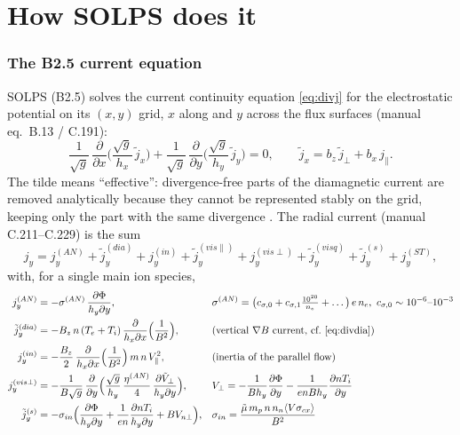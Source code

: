 \documentclass[11pt,a4paper]{article}
\newcommand{\Te}{T_e}
\newcommand{\Ti}{T_i}
\newcommand{\jpar}{j_\parallel}
\begin{document}
\part{How SOLPS does it}

\section{The B2.5 current equation}

SOLPS (B2.5) solves the current continuity equation \eqref{eq:divj} for the electrostatic potential on its
$(x,y)$ grid, $x$ along and $y$ across the flux surfaces (manual eq.~B.13 / C.191):
\begin{equation}
  \frac{1}{\sqrt g}\,\frac{\partial}{\partial x}\Big(\frac{\sqrt g}{h_x}\,\tilde j_x\Big)
  + \frac{1}{\sqrt g}\,\frac{\partial}{\partial y}\Big(\frac{\sqrt g}{h_y}\,\tilde j_y\Big) = 0,
  \qquad \tilde j_x = b_z\,\tilde j_\perp + b_x\,\jpar .
  \label{eq:solpscc}
\end{equation}
The tilde means ``effective'': divergence-free parts of the diamagnetic current are removed analytically because they
cannot be represented stably on the grid, keeping only the part with the same divergence \cite{rozhansky2001}. The
radial current (manual C.211--C.229) is the sum
\begin{equation}
  j_y = j^{(AN)}_y + \tilde j^{(dia)}_y + j^{(in)}_y + \tilde j^{(vis\parallel)}_y + j^{(vis\perp)}_y
      + \tilde j^{(visq)}_y + \tilde j^{(s)}_y + j^{(ST)}_y ,
  \label{eq:solpsjy}
\end{equation}
with, for a single main ion species,
\begin{align}
  j^{(AN)}_y &= -\sigma^{(AN)}\,\frac{\partial\Phi}{h_y\partial y},
  && \sigma^{(AN)} = \big(c_{\sigma,0} + c_{\sigma,1}\tfrac{10^{20}}{n_e} + \dots\big)\,e\,n_e,\ c_{\sigma,0}\sim10^{-6}\text{--}10^{-3}
  \label{eq:solpsan}\\
  \tilde j^{(dia)}_y &= -B_z\,n\,(\Te+\Ti)\,\frac{\partial}{h_x\partial x}\Big(\frac{1}{B^2}\Big),
  && \text{(vertical $\nabla B$ current, cf.\ \eqref{eq:divdia})}
  \label{eq:solpsdia}\\
  j^{(in)}_y &= -\frac{B_z}{2}\,\frac{\partial}{h_x\partial x}\Big(\frac{1}{B^2}\Big)\,m\,n\,V_\parallel^2,
  && \text{(inertia of the parallel flow)}
  \label{eq:solpsin}\\
  j^{(vis\perp)}_y &= -\frac{1}{B\sqrt g}\,\frac{\partial}{\partial y}\Big(\frac{\sqrt g}{h_y}\,\frac{\eta^{(AN)}}{4}\,\frac{\partial \tilde V_\perp}{h_y\partial y}\Big),
  && V_\perp = -\frac{1}{B h_y}\frac{\partial\Phi}{\partial y} - \frac{1}{e n B h_y}\frac{\partial n\Ti}{\partial y}
  \label{eq:solpsvis}\\
  \tilde j^{(s)}_y &= -\sigma_{in}\Big(\frac{\partial\Phi}{h_y\partial y} + \frac{1}{en}\frac{\partial n\Ti}{h_y\partial y} + B V_{n\perp}\Big),
  && \sigma_{in} = \frac{\tilde\mu\, m_p\, n\, n_n\langle V\sigma_{cx}\rangle}{B^2}
  \label{eq:solpsin2}
\end{align}
\end{document}
